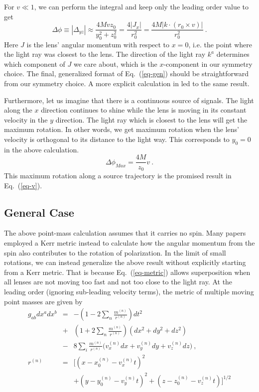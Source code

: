 \documentclass[aps,showpacs,twocolumn,floats,prd,superscriptaddress,nofootinbib]{revtex4-1}
\begin{document}
For $v\ll1$, we can perform the integral and keep only the leading order value to get 
\begin{equation}
\Delta\phi \equiv |\Delta_{yz}| \approx \frac{4Mvz_0}{y_0^2 + z_0^2}
= \frac{4|J_x|}{r_0^2}
= \frac{4 M |k\cdot(r_0\times v)|}{r_0^2}~.
\label{eq-gen}
\end{equation}
Here $J$ is the lens' angular momentum with respect to $x=0$, i.e. the point where the light ray was closest to the lens.
The direction of the light ray $k^a$ determines which component of $J$ we care about, which is the $x$-component in our symmetry choice.
The final, generalized format of Eq.~(\ref{eq-gen}) should be straightforward from our symmetry choice.
A more explicit calculation in \cite{KopMas01} led to the same result.

Furthermore, let us imagine that there is a continuous source of signals.
The light along the $x$ direction continues to shine while the lens is moving in its constant velocity in the $y$ direction.
The light ray which is closest to the lens will get the maximum rotation.
In other words, we get maximum rotation when the lens' velocity is orthogonal to its distance to the light way.
This corresponds to $y_0=0$ in the above calculation.
\begin{equation}
\Delta \phi_{Max} = \frac{4M}{z_0}v ~.
\end{equation}
This maximum rotation along a source trajectory is the promised result in Eq.~(\ref{eq-v}).

\subsection{General Case}

The above point-mass calculation assumes that it carries no spin. 
Many papers employed a Kerr metric instead to calculate how the angular momentum from the spin also contributes to the rotation of polarization. 
In the limit of small rotations, we can instead generalize the above result without explicitly starting from a Kerr metric. 
That is because Eq.~(\ref{eq-metric}) allows superposition when all lenses are not moving too fast and not too close to the light ray. 
At the leading order (ignoring sub-leading velocity terms), the metric of multiple moving point masses are given by
\begin{eqnarray}
g_{ab}dx^adx^b &=& -\left( 1 - 2\sum_n \frac{m^{(n)}}{r^{(n)}} \right)dt^2
 \\ \nonumber
&+& \left( 1 + 2\sum_n \frac{m^{(n)}}{r^{(n)}} \right) (dx^2+dy^2+dz^2) 
\\ \nonumber
&-& 8\sum_i \frac{m^{(n)} }{r^{(n)}}
\biggl(v^{(n)}_x dx  + v^{(n)}_y dy+ v^{(n)}_z dz\biggr)~, \\
r^{(n)} &=& \bigg[\left(x - x_0^{(n)} - v^{(n)}_x t\right)^2 
\\ \nonumber
& & + \left(y - y_0^{(n)} - v^{(n)}_y t\right)^2 
+ \left(z - z_0^{(n)} - v^{(n)}_z t\right) \bigg]^{1/2}
\end{eqnarray}
\end{document}
